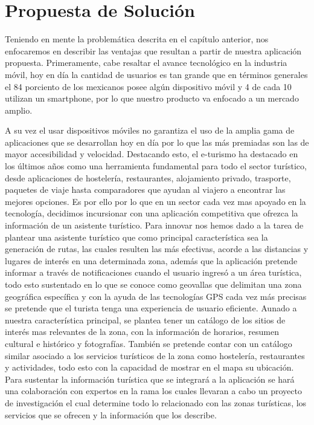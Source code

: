 \section{Propuesta de Solución}


	Teniendo en mente la problemática descrita en el capítulo anterior, nos enfocaremos en describir las ventajas que resultan a partir de nuestra aplicación propuesta.
	Primeramente, cabe resaltar el avance tecnológico en la industria móvil, hoy en día la cantidad de usuarios es tan grande que en términos generales el 84 porciento de los mexicanos posee algún dispositivo móvil y 4 de cada 10 utilizan un smartphone, por lo que nuestro producto va enfocado a un mercado amplio.
	
	A su vez el usar dispositivos móviles no garantiza el uso de la amplia gama de aplicaciones que se desarrollan hoy en día por lo que las más premiadas son las de mayor accesibilidad y velocidad. Destacando esto, el e-turismo ha destacado en los últimos años como una herramienta fundamental para todo el sector turístico, desde aplicaciones de hostelería, restaurantes, alojamiento privado, trasporte, paquetes de viaje hasta comparadores que ayudan al viajero a encontrar las mejores opciones. Es por ello por lo que en un sector cada vez mas apoyado en la tecnología, decidimos incursionar con una aplicación competitiva que ofrezca la información de un asistente turístico.
	Para innovar nos hemos dado a la tarea de plantear una asistente turístico que como principal característica sea la generación de rutas, las cuales resulten las más efectivas, acorde a las distancias y lugares de interés en una determinada zona, además que la aplicación pretende informar a través de notificaciones cuando el usuario ingresó a un área turística, todo esto sustentado en lo que se conoce como geovallas que delimitan una zona geográfica específica y con la ayuda de las tecnologías GPS cada vez más precisas se pretende que el turista tenga una experiencia de usuario eficiente. 
	Aunado a nuestra característica principal, se plantea tener un catálogo de los sitios de interés mas relevantes de la zona, con la información de horarios, resumen cultural e histórico y fotografías. También se pretende contar con un catálogo similar asociado a los servicios turísticos de la zona como hostelería, restaurantes y actividades, todo esto con la capacidad de mostrar en el mapa su ubicación.
	Para sustentar la información turística que se integrará a la aplicación se hará una colaboración con expertos en la rama los cuales llevaran a cabo un proyecto de investigación el cual determine todo lo relacionado con las zonas turísticas, los servicios que se ofrecen y la información que los describe.

